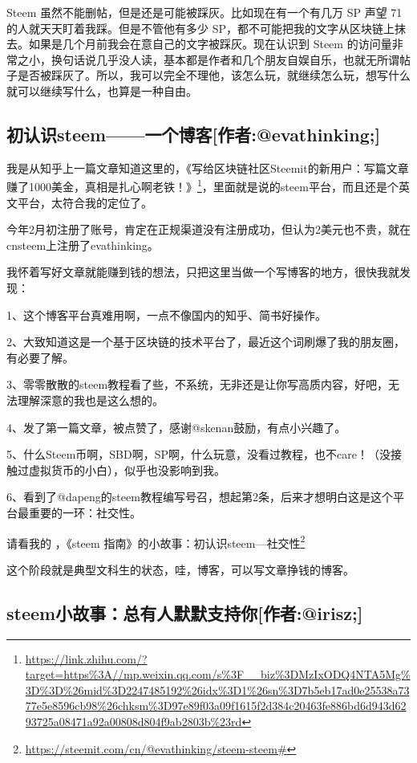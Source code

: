 \documentclass[]{ctexbook}
\renewcommand{\href}[2]{#2\footnote{\url{#1}}}
\begin{document}
Steem 虽然不能删帖，但是还是可能被踩灰。比如现在有一个有几万 SP 声望 71 的人就天天盯着我踩。但是不管他有多少 SP，都不可能把我的文字从区块链上抹去。如果是几个月前我会在意自己的文字被踩灰。现在认识到 Steem 的访问量非常之小，换句话说几乎没人读，基本都是作者和几个朋友自娱自乐，也就无所谓帖子是否被踩灰了。所以，我可以完全不理他，该怎么玩，就继续怎么玩，想写什么就可以继续写什么，也算是一种自由。

\hypertarget{steemevathinking}{%
\subsection{初认识steem------一个博客{[}作者:@evathinking;{]}}\label{steemevathinking}}

我是从知乎上一篇文章知道这里的，\href{https://link.zhihu.com/?target=https\%3A//mp.weixin.qq.com/s\%3F__biz\%3DMzIxODQ4NTA5Mg\%3D\%3D\%26mid\%3D2247485192\%26idx\%3D1\%26sn\%3D7b5eb17ad0e25538a7377e5e8596cb98\%26chksm\%3D97e89f03a09f1615f2d384c20463fe886bd6d943d6293725a08471a92a00808d804f9ab2803b\%23rd}{《写给区块链社区Steemit的新用户：写篇文章赚了1000美金，真相是扎心啊老铁！》}，里面就是说的steem平台，而且还是个英文平台，太符合我的定位了。

今年2月初注册了账号，肯定在正规渠道没有注册成功，但认为2美元也不贵，就在cnsteem上注册了evathinking。

我怀着写好文章就能赚到钱的想法，只把这里当做一个写博客的地方，很快我就发现：

1、这个博客平台真难用啊，一点不像国内的知乎、简书好操作。

2、大致知道这是一个基于区块链的技术平台了，最近这个词刷爆了我的朋友圈，有必要了解。

3、零零散散的steem教程看了些，不系统，无非还是让你写高质内容，好吧，无法理解深意的我也是这么想的。

4、发了第一篇文章，被点赞了，感谢@skenan鼓励，有点小兴趣了。

5、什么Steem币啊，SBD啊，SP啊，什么玩意，没看过教程，也不care！（没接触过虚拟货币的小白），似乎也没影响到我。

6、看到了@dapeng的steem教程编写号召，想起第2条，后来才想明白这是这个平台最重要的一环：社交性。

请看我的 ，\href{https://steemit.com/cn/@evathinking/steem-steem\#}{《steem 指南》的小故事：初认识steem---社交性}

这个阶段就是典型文科生的状态，哇，博客，可以写文章挣钱的博客。

\hypertarget{steemirisz}{%
\subsection{steem小故事：总有人默默支持你{[}作者:@irisz;{]}}\label{steemirisz}}
\end{document}
